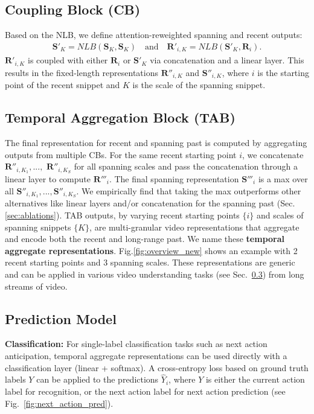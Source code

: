 \documentclass[runningheads]{llncs}
\begin{document}
\subsection{Coupling Block (CB)}\label{sec:cb} 
Based on the NLB, we define attention-reweighted spanning and recent outputs:
\begin{align}
 \textbf{S}'_{K} = NLB(\textbf{S}_{K},\textbf{S}_{K})
\quad \text{and} \quad 
 \textbf{R}'_{i,K} = NLB(\textbf{S}'_{K}, \textbf{R}_i)\label{coupledAttn}.
\end{align}
\noindent $\textbf{R}'_{i,K}$ is coupled with either $\textbf{R}_i$ or $\textbf{S}'_K$ via concatenation and a linear layer. This results in the fixed-length representations $\textbf{R}''_{i,K}$ and $\textbf{S}''_{i,K}$, where $i$ is the starting point of the recent snippet and $K$ is the scale of the spanning snippet. 
 
\subsection{Temporal Aggregation Block (TAB)}\label{sec:tab}
The final representation for recent and spanning past is computed by aggregating outputs from multiple CBs. For the same recent starting point $i$, we concatenate $\textbf{R}''_{i,K_1}, ...,$ $\textbf{R}''_{i,K_S}$ for all spanning scales and pass the concatenation through a linear layer to compute $\textbf{R}'''_i$. The final spanning representation $\textbf{S}'''_{i}$ is a max over all $\textbf{S}''_{i,K_1}, ..., \textbf{S}''_{i,K_S}$. We empirically find that taking the max outperforms other alternatives like linear layers and/or concatenation for the spanning past (Sec. \ref{sec:ablations}).  TAB outputs, by varying recent starting points $\{i\}$ and scales of spanning snippets $\{K\}$, are multi-granular video representations that aggregate and encode both the recent and long-range past. We name these \textbf{temporal aggregate representations}. Fig.\ref{fig:overview_new} shows an example with 2 recent starting points and 3 spanning scales. These representations are generic and can be applied in various video understanding tasks (see Sec.~\ref{sec:pred}) from long streams of video. 
 
\subsection{Prediction Model}\label{sec:pred}
\textbf{Classification:} For single-label classification tasks such as next action anticipation, temporal aggregate representations can be used directly with a classification layer (linear + softmax). A cross-entropy loss based on ground truth labels $Y$ can be applied to the predictions $\hat{Y}_{i}$, where $Y$ is either the current action label for recognition, or the next action label for next action prediction (see Fig.~\ref{fig:next_action_pred}). 
\end{document}

